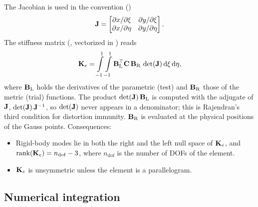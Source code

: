 The Jacobian is used in the convention ()
\begin{equation}
  \mathbf{J} = \begin{bmatrix} \partial x/\partial\xi & \partial y/\partial\xi\\
                            \partial x/\partial\eta & \partial y/\partial\eta
            \end{bmatrix}.
\end{equation}
The stiffness matrix (, vectorized in
) reads
\begin{equation}
  \mathbf{K}_e = \int\limits^{1}_{-1}\int\limits^{1}_{-1}\mathbf{B}_\mathrm{L}^{\top}\mathbf{C}\,
  \mathbf{B}_\mathrm{R}\,\det(\mathbf{J})\,\mathrm{d}\xi\,\mathrm{d}\eta,
\end{equation}
where $\mathbf{B}_\mathrm{L}$ holds the derivatives of the parametric (test) and
$\mathbf{B}_\mathrm{R}$ those of the metric (trial) functions. The product
$\det(\mathbf{J})\,\mathbf{B}_\mathrm{L}$ is computed with the adjugate of $\mathbf{J}$,
$\det(\mathbf{J})\,\mathbf{J}^{-1}$, so $\det(\mathbf{J})$ never appears in a
denominator; this is Rajendran's third condition for distortion immunity.
$\mathbf{B}_\mathrm{R}$ is evaluated at the physical positions of the Gauss points.
Consequences:
\begin{itemize}
  \item Rigid-body modes lie in both the right and the left null space of
    $\mathbf{K}_e$, and $\operatorname{rank}(\mathbf{K}_e) = n_\mathrm{dof}-3$, where
    $n_\mathrm{dof}$ is the number of DOFs of the element.
  \item $\mathbf{K}_e$ is unsymmetric unless the element is a parallelogram.
\end{itemize}

\subsection*{Numerical integration}
\label{sec:quadrature}

